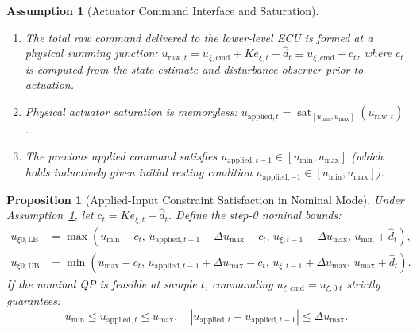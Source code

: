 \documentclass[journal]{IEEEtran}
\newtheorem{proposition}{Proposition}
\newtheorem{assumption}{Assumption}
\begin{document}
\begin{assumption}[Actuator Command Interface and Saturation]
\label{ass:actuator}
\begin{enumerate}
    \item The total raw command delivered to the lower-level ECU is formed at a physical summing junction: $u_{\mathrm{raw},t} = u_{\xi,\mathrm{cmd}} + K e_{\xi,t} - \hat d_t \equiv u_{\xi,\mathrm{cmd}} + c_t$, where $c_t$ is computed from the state estimate and disturbance observer prior to actuation.
    \item Physical actuator saturation is memoryless: $u_{\mathrm{applied},t} = \operatorname{sat}_{[u_{\min}, u_{\max}]}(u_{\mathrm{raw},t})$.
    \item The previous applied command satisfies $u_{\mathrm{applied},t-1} \in [u_{\min}, u_{\max}]$ (which holds inductively given initial resting condition $u_{\mathrm{applied},-1} \in [u_{\min}, u_{\max}]$).
\end{enumerate}
\end{assumption}

\begin{proposition}[Applied-Input Constraint Satisfaction in Nominal Mode]
Under Assumption~\ref{ass:actuator}, let $c_t = K e_{\xi,t} - \hat d_t$. Define the step-0 nominal bounds:
\begin{align}
u_{\xi 0,\mathrm{LB}} &= \max\left(u_{\min} - c_t, \, u_{\mathrm{applied},t-1} - \Delta u_{\max} - c_t, \, u_{\xi,t-1} - \Delta u_{\max}, \, u_{\min} + \hat d_t\right), \label{eq:step0_lb} \\
u_{\xi 0,\mathrm{UB}} &= \min\left(u_{\max} - c_t, \, u_{\mathrm{applied},t-1} + \Delta u_{\max} - c_t, \, u_{\xi,t-1} + \Delta u_{\max}, \, u_{\max} + \hat d_t\right). \label{eq:step0_ub}
\end{align}
If the nominal QP is feasible at sample $t$, commanding $u_{\xi,\mathrm{cmd}} = u_{\xi,0|t}$ strictly guarantees:
\begin{equation}
u_{\min} \le u_{\mathrm{applied},t} \le u_{\max}, \quad |u_{\mathrm{applied},t} - u_{\mathrm{applied},t-1}| \le \Delta u_{\max}.
\end{equation}
\end{proposition}
\end{document}
